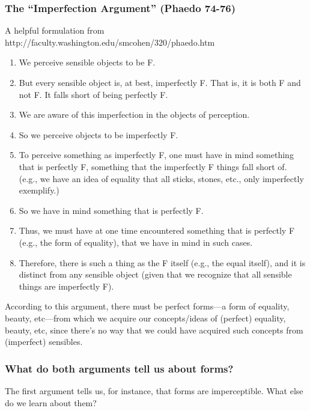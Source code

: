\documentclass[oneside]{article}
\begin{document}
\subsubsection*{The ``Imperfection Argument'' (Phaedo 74-76)}
A helpful formulation from  http://faculty.washington.edu/smcohen/320/phaedo.htm
\begin{enumerate}
\item  We perceive sensible objects to be F.
\item But every sensible object is, at best, imperfectly F. That is, it is both F and not F. It falls short of
  being perfectly F.
\item We are aware of this imperfection in the objects of perception.
\item  So we perceive objects to be imperfectly F.
\item  To perceive something as  imperfectly F, one must have in mind something that is perfectly F,  something that the imperfectly F things fall short of. (e.g., we have
  an idea of equality that all sticks, stones, etc., only imperfectly
  exemplify.)
\item So we have in mind something that is perfectly F.
\item  Thus, we must have at one time encountered something that is perfectly
  F (e.g., the form of equality), that we have in mind in such cases.
\item  Therefore, there is such a thing as the F itself (e.g., the equal itself), and it
  is distinct from any sensible object (given that we recognize that all
  sensible things are imperfectly F).
\end{enumerate}
According to this argument, there must be  perfect forms---a form of equality, beauty, etc---from which we  acquire our concepts/ideas of (perfect) equality, beauty, etc, since  there's no way that we could have acquired such concepts from  (imperfect) sensibles.

\subsubsection*{ What do both arguments tell us about forms?}

The first argument tells us, for instance, that forms are imperceptible. What else do we learn about them? 


\end{document}
